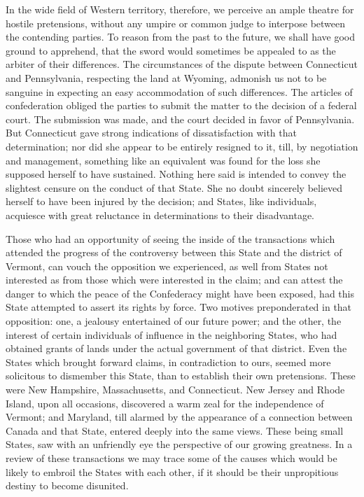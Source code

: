 In the wide field of Western territory, therefore, we perceive an ample theatre for hostile pretensions, without any umpire or common judge to interpose between the contending parties. To reason from the past to the future, we shall have good ground to apprehend, that the sword would sometimes be appealed to as the arbiter of their differences. The circumstances of the dispute between Connecticut and Pennsylvania, respecting the land at Wyoming, admonish us not to be sanguine in expecting an easy accommodation of such differences. The articles of confederation obliged the parties to submit the matter to the decision of a federal court. The submission was made, and the court decided in favor of Pennsylvania. But Connecticut gave strong indications of dissatisfaction with that determination; nor did she appear to be entirely resigned to it, till, by negotiation and management, something like an equivalent was found for the loss she supposed herself to have sustained. Nothing here said is intended to convey the slightest censure on the conduct of that State. She no doubt sincerely believed herself to have been injured by the decision; and States, like individuals, acquiesce with great reluctance in determinations to their disadvantage.

Those who had an opportunity of seeing the inside of the transactions which attended the progress of the controversy between this State and the district of Vermont, can vouch the opposition we experienced, as well from States not interested as from those which were interested in the claim; and can attest the danger to which the peace of the Confederacy might have been exposed, had this State attempted to assert its rights by force. Two motives preponderated in that opposition: one, a jealousy entertained of our future power; and the other, the interest of certain individuals of influence in the neighboring States, who had obtained grants of lands under the actual government of that district. Even the States which brought forward claims, in contradiction to ours, seemed more solicitous to dismember this State, than to establish their own pretensions. These were New Hampshire, Massachusetts, and Connecticut. New Jersey and Rhode Island, upon all occasions, discovered a warm zeal for the independence of Vermont; and Maryland, till alarmed by the appearance of a connection between Canada and that State, entered deeply into the same views. These being small States, saw with an unfriendly eye the perspective of our growing greatness. In a review of these transactions we may trace some of the causes which would be likely to embroil the States with each other, if it should be their unpropitious destiny to become disunited.

